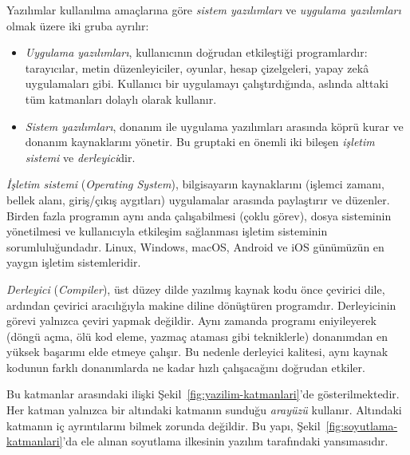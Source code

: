 Yazılımlar kullanılma amaçlarına göre \emph{sistem yazılımları} ve \emph{uygulama yazılımları} olmak üzere iki gruba ayrılır:

\begin{itemize}[nosep, leftmargin=*]
    \item \emph{Uygulama yazılımları}, kullanıcının doğrudan etkileştiği programlardır: tarayıcılar, metin düzenleyiciler, oyunlar, hesap çizelgeleri, yapay zekâ uygulamaları gibi. Kullanıcı bir uygulamayı çalıştırdığında, aslında alttaki tüm katmanları dolaylı olarak kullanır.
    \item \emph{Sistem yazılımları}, donanım ile uygulama yazılımları arasında köprü kurar ve donanım kaynaklarını yönetir. Bu gruptaki en önemli iki bileşen \emph{işletim sistemi} ve \emph{derleyici}dir.
\end{itemize}

\emph{İşletim sistemi} (\emph{Operating System}), bilgisayarın kaynaklarını (işlemci zamanı, bellek alanı, giriş/çıkış aygıtları) uygulamalar arasında paylaştırır ve düzenler. Birden fazla programın aynı anda çalışabilmesi (çoklu görev), dosya sisteminin yönetilmesi ve kullanıcıyla etkileşim sağlanması işletim sisteminin sorumluluğundadır. Linux, Windows, macOS, Android ve iOS günümüzün en yaygın işletim sistemleridir.

\emph{Derleyici} (\emph{Compiler}), üst düzey dilde yazılmış kaynak kodu önce çevirici dile, ardından çevirici aracılığıyla makine diline dönüştüren programdır. Derleyicinin görevi yalnızca çeviri yapmak değildir. Aynı zamanda programı eniyileyerek (döngü açma, ölü kod eleme, yazmaç ataması gibi tekniklerle) donanımdan en yüksek başarımı elde etmeye çalışır. Bu nedenle derleyici kalitesi, aynı kaynak kodunun farklı donanımlarda ne kadar hızlı çalışacağını doğrudan etkiler.

Bu katmanlar arasındaki ilişki Şekil~\ref{fig:yazilim-katmanlari}'de gösterilmektedir. Her katman yalnızca bir altındaki katmanın sunduğu \emph{arayüzü} kullanır. Altındaki katmanın iç ayrıntılarını bilmek zorunda değildir. Bu yapı, Şekil~\ref{fig:soyutlama-katmanlari}'da ele alınan soyutlama ilkesinin yazılım tarafındaki yansımasıdır.

